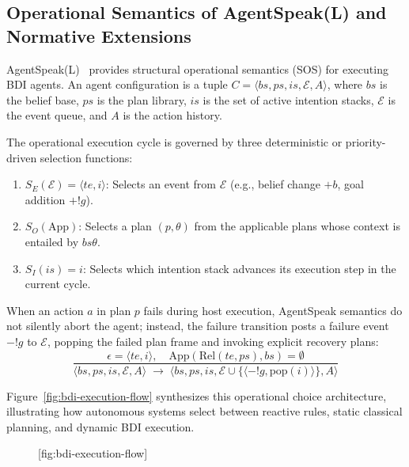 \documentclass[11pt,a4paper]{article}
\begin{document}
\subsection{Operational Semantics of AgentSpeak(L) and Normative Extensions}

AgentSpeak(L)~ provides structural operational semantics (SOS) for executing BDI agents. An agent configuration is a tuple $C = \langle bs, ps, is, \mathcal{E}, A \rangle$, where $bs$ is the belief base, $ps$ is the plan library, $is$ is the set of active intention stacks, $\mathcal{E}$ is the event queue, and $A$ is the action history.

The operational execution cycle is governed by three deterministic or priority-driven selection functions:
\begin{enumerate}[leftmargin=1.8em,itemsep=2pt]
  \item $S_E(\mathcal{E}) = \langle te, i \rangle$: Selects an event from $\mathcal{E}$ (e.g., belief change $+b$, goal addition $+!g$).
  \item $S_O(\mathrm{App})$: Selects a plan $(p, \theta)$ from the applicable plans whose context is entailed by $bs\theta$.
  \item $S_I(is) = i$: Selects which intention stack advances its execution step in the current cycle.
\end{enumerate}

When an action $a$ in plan $p$ fails during host execution, AgentSpeak semantics do not silently abort the agent; instead, the failure transition posts a failure event $-!g$ to $\mathcal{E}$, popping the failed plan frame and invoking explicit recovery plans:
\begin{equation}
\frac{\epsilon = \langle te, i \rangle, \quad \mathrm{App}(\mathrm{Rel}(te, ps), bs) = \emptyset}{\langle bs, ps, is, \mathcal{E}, A \rangle \;\longrightarrow\; \langle bs, ps, is, \mathcal{E} \cup \{\langle -!g, \mathrm{pop}(i) \rangle\}, A \rangle}
\end{equation}

Figure~\ref{fig:bdi-execution-flow} synthesizes this operational choice architecture, illustrating how autonomous systems select between reactive rules, static classical planning, and dynamic BDI execution.

\begin{figure}[tp]
  \centering
  [fig:bdi-execution-flow]
\end{figure}
\end{document}
